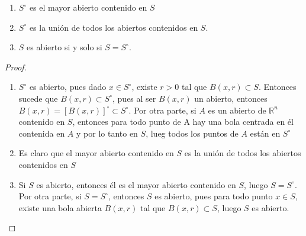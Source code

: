 \begin{proposición}
    \begin{enumerate}
        \item $S^\circ$ es el mayor abierto contenido en $S$
        \item $S^\circ$ es la unión de todos los abiertos contenidos en $S$.
        \item $S$ es abierto si y solo si $S = S^\circ$.
    \end{enumerate}
\end{proposición}
\begin{proof}
    \begin{enumerate}
        \item $S^\circ$ es abierto, pues dado $x \in S^\circ$, existe $r > 0$ tal que $B(x, r) \subset S$. Entonces sucede que $B(x, r) \subset S^\circ$, pues al ser $B(x, r)$ un abierto, entonces $B(x, r) = [B(x, r)]^{\circ} \subset S^\circ$. Por otra parte, si $A$ es un abierto de $\mathbb{R}^n$ contenido en $S$, entonces para todo punto de A hay una bola centrada en él contenida en $A$ y por lo tanto en $S$, lueg todos los puntos de $A$ están en $S^\circ$
        \item Es claro que el mayor abierto contenido en $S$ es la unión de todos los abiertos contenidos en $S$
        \item Si $S$ es abierto, entonces él es el mayor abierto contenido en $S$, luego $S = S^\circ$. Por otra parte, si $S = S^\circ$, entonces $S$ es abierto, pues para todo punto $x \in S$, existe una bola abierta $B(x, r)$ tal que $B(x, r) \subset S$, luego $S$ es abierto.	
    \end{enumerate}
\end{proof}

